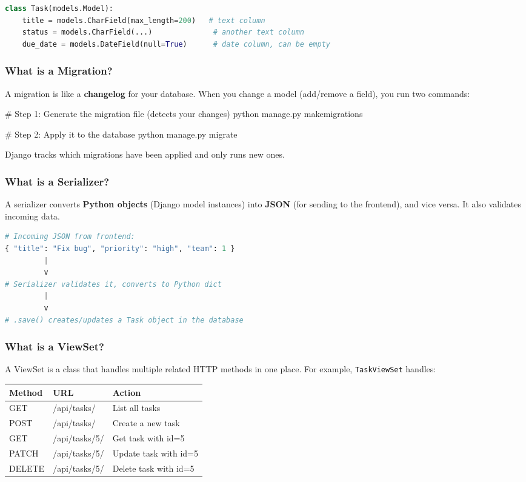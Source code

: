 \documentclass[12pt,a4paper]{article}
\begin{document}
\begin{lstlisting}[language=Python, caption=Example: a simple model]
class Task(models.Model):
    title = models.CharField(max_length=200)   # text column
    status = models.CharField(...)              # another text column
    due_date = models.DateField(null=True)      # date column, can be empty
\end{lstlisting}

\subsubsection{What is a Migration?}
A migration is like a \textbf{changelog} for your database. When you change a model (add/remove a field), you run two commands:
\begin{termbox}
# Step 1: Generate the migration file (detects your changes)
python manage.py makemigrations

# Step 2: Apply it to the database
python manage.py migrate
\end{termbox}
Django tracks which migrations have been applied and only runs new ones.

\subsubsection{What is a Serializer?}
A serializer converts \textbf{Python objects} (Django model instances) into \textbf{JSON} (for sending to the frontend), and vice versa. It also validates incoming data.

\begin{lstlisting}[language=Python, caption=Serializer flow]
# Incoming JSON from frontend:
{ "title": "Fix bug", "priority": "high", "team": 1 }
         |
         v
# Serializer validates it, converts to Python dict
         |
         v
# .save() creates/updates a Task object in the database
\end{lstlisting}

\subsubsection{What is a ViewSet?}
A ViewSet is a class that handles multiple related HTTP methods in one place. For example, \texttt{TaskViewSet} handles:

\begin{center}
\begin{tabular}{lll}
\toprule
\textbf{Method} & \textbf{URL} & \textbf{Action} \\
\midrule
GET & /api/tasks/ & List all tasks \\
POST & /api/tasks/ & Create a new task \\
GET & /api/tasks/5/ & Get task with id=5 \\
PATCH & /api/tasks/5/ & Update task with id=5 \\
DELETE & /api/tasks/5/ & Delete task with id=5 \\
\bottomrule
\end{tabular}
\end{center}
\end{document}
